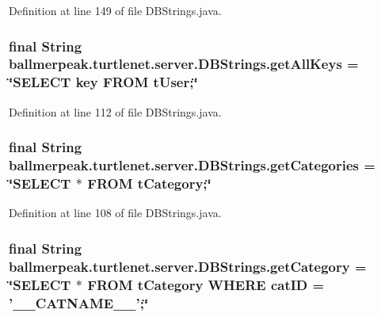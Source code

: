 Definition at line 149 of file D\-B\-Strings.\-java.

\hypertarget{classballmerpeak_1_1turtlenet_1_1server_1_1DBStrings_a421524524ae9aecc5f05c4a087a8a3b9}{
\subsubsection[{get\-All\-Keys}]{\setlength{\rightskip}{0pt plus 5cm}final String ballmerpeak.\-turtlenet.\-server.\-D\-B\-Strings.\-get\-All\-Keys = \char`\"{}S\-E\-L\-E\-C\-T key F\-R\-O\-M t\-User;\char`\"{}\hspace{0.3cm}{\ttfamily [static]}}}\label{classballmerpeak_1_1turtlenet_1_1server_1_1DBStrings_a421524524ae9aecc5f05c4a087a8a3b9}


Definition at line 112 of file D\-B\-Strings.\-java.

\hypertarget{classballmerpeak_1_1turtlenet_1_1server_1_1DBStrings_abe38c9de113b63c18b1e7083e8b1af6f}{
\subsubsection[{get\-Categories}]{\setlength{\rightskip}{0pt plus 5cm}final String ballmerpeak.\-turtlenet.\-server.\-D\-B\-Strings.\-get\-Categories = \char`\"{}S\-E\-L\-E\-C\-T $\ast$ F\-R\-O\-M t\-Category;\char`\"{}\hspace{0.3cm}{\ttfamily [static]}}}\label{classballmerpeak_1_1turtlenet_1_1server_1_1DBStrings_abe38c9de113b63c18b1e7083e8b1af6f}


Definition at line 108 of file D\-B\-Strings.\-java.

\hypertarget{classballmerpeak_1_1turtlenet_1_1server_1_1DBStrings_aefd36226bfa1c2c3f5b7cfd7a88c8ea6}{
\subsubsection[{get\-Category}]{\setlength{\rightskip}{0pt plus 5cm}final String ballmerpeak.\-turtlenet.\-server.\-D\-B\-Strings.\-get\-Category = \char`\"{}S\-E\-L\-E\-C\-T $\ast$ F\-R\-O\-M t\-Category W\-H\-E\-R\-E cat\-I\-D = '\-\_\-\-\_\-\-C\-A\-T\-N\-A\-M\-E\-\_\-\-\_\-';\char`\"{}\hspace{0.3cm}{\ttfamily [static]}}}\label{classballmerpeak_1_1turtlenet_1_1server_1_1DBStrings_aefd36226bfa1c2c3f5b7cfd7a88c8ea6}


